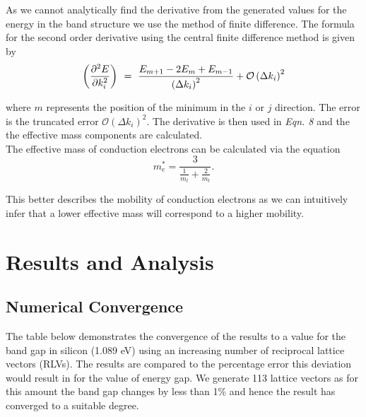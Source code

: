 \documentclass[10pt, twocolumn]{revtex4}    %
\begin{document}
As we cannot analytically find the derivative from the generated values for the energy in the band structure we use the method of finite difference. The formula for the second order derivative using the central finite difference method is given by \cite{ref14}
\begin{equation}
\left(\pdv[2]{E}{k_i}\right)_{\ }=\ \frac{E_{m+1}-2E_m+E_{m-1}}{\left(\Delta k_i\right)^2}+\mathcal{O}\left(\Delta k_i\right)^2
\end{equation}

where $m$ represents the position of the minimum in the $i$ or $j$ direction.
The error is the truncated error $\mathcal{O}\left(\Delta k_i\right)^2$. The derivative is then used in \textit{Eqn. 8} and the the effective mass components are calculated.\\

The effective mass of conduction electrons can be calculated via the equation
\begin{equation}
m^*_e = \frac{3}{\frac{1}{m_l}+\frac{2}{m_t}}.
\end{equation}

This better describes the mobility of conduction electrons as we can intuitively infer that a lower effective mass will correspond to a higher mobility.



\section{Results and Analysis}

\subsection{Numerical Convergence}

The table below demonstrates the convergence of the results to a value for the band gap in silicon (1.089 eV) using an increasing number of reciprocal lattice vectors (RLVs). The results are compared to the percentage error this deviation would result in for the value of energy gap. We generate 113 lattice vectors as for this amount the band gap changes by less than 1\% and hence the result has converged to a suitable degree.\\
\end{document}
